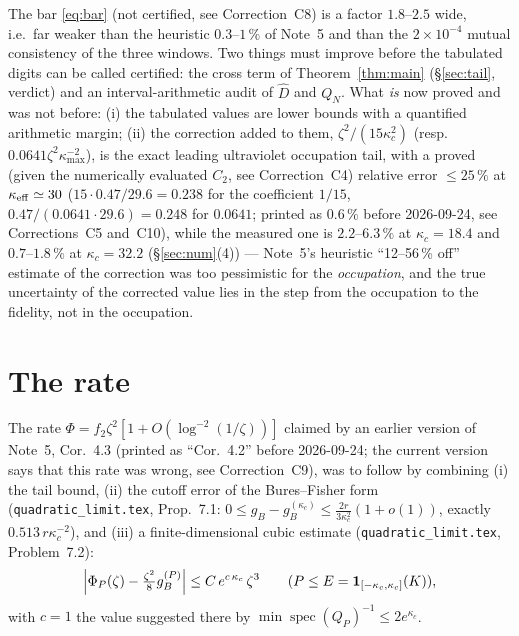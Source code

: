 \documentclass[11pt]{article}
\providecommand{\one}{\mathbf 1}\providecommand{\CAR}{\mathrm{CAR}}\providecommand{\Ran}{\operatorname{Ran}}\providecommand{\dist}{\operatorname{dist}}\providecommand{\norm}[1]{\lVert #1\rVert}
\begin{document}
\begin{verdictgap}
The bar \eqref{eq:bar} (not certified, see Correction~C8) is a factor $1.8$--$2.5$ wide, i.e.\ far weaker than the heuristic $0.3$--$1\,\%$ of
Note~5 and than the $2\times10^{-4}$ mutual consistency of the three windows.  Two things must improve
before the tabulated digits can be called certified: the cross term of Theorem~\ref{thm:main}
(\S\ref{sec:tail}, verdict) and an interval-arithmetic audit of $\widehat D$ and $Q_N$.  What
\emph{is} now proved and was not before: (i) the tabulated values are lower bounds with a quantified
arithmetic margin; (ii) the correction added to them, $\zeta^2/(15\kappa_c^2)$ (resp.\
$0.0641\zeta^2\kappa_{\max}^{-2}$), is the exact leading ultraviolet occupation tail, with a proved (given the numerically evaluated $C_2$, see Correction~C4)
relative error $\le25\,\%$ at $\kappa_{\rm eff}\simeq30$ ($15\cdot0.47/29.6=0.238$ for the coefficient $1/15$, $0.47/(0.0641\cdot29.6)=0.248$ for $0.0641$; printed as $0.6\,\%$ before 2026-09-24, see Corrections~C5 and~C10), while the measured one is $2.2$--$6.3\,\%$ at $\kappa_c=18.4$ and $0.7$--$1.8\,\%$ at $\kappa_c=32.2$ (\S\ref{sec:num}(4)) --- Note~5's heuristic ``12--56\,\% off''
estimate of the correction was too pessimistic for the \emph{occupation}, and the true uncertainty of
the corrected value lies in the step from the occupation to the fidelity, not in the occupation.
\end{verdictgap}
\section{The rate}\label{sec:rate}

The rate $\Phi=f_2\zeta^2[1+O(\log^{-2}(1/\zeta))]$ claimed by an earlier version of Note~5, Cor.~4.3 (printed as ``Cor.~4.2'' before 2026-09-24; the current version says that this rate was wrong, see Correction~C9), was to follow by combining
(i) the tail bound, (ii) the cutoff error of the Bures--Fisher form
(\texttt{quadratic\_limit.tex}, Prop.~7.1: $0\le g_B-g_B^{(\kappa_c)}\le\frac{2r}{3\kappa_c^2}(1+o(1))$,
exactly $0.513\,r\kappa_c^{-2}$), and (iii) a finite-dimensional cubic estimate
(\texttt{quadratic\_limit.tex}, Problem~7.2):
\begin{equation}\label{eq:cubic}
 \Bigl|\Phi_P(\zeta)-\tfrac{\zeta^2}8g_B^{(P)}\Bigr|\le C\,e^{c\,\kappa_c}\,\zeta^3
 \qquad(P\le E=\one_{[-\kappa_c,\kappa_c]}(K)),
\end{equation}
with $c=1$ the value suggested there by $\min\operatorname{spec}(Q_P)^{-1}\le2e^{\kappa_c}$.
\end{document}
